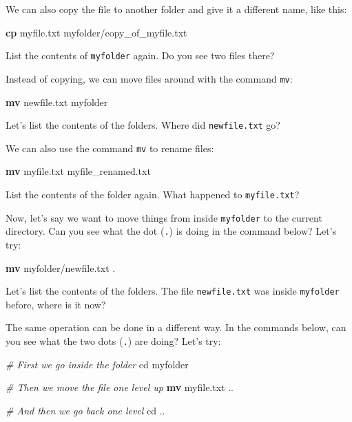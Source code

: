 \documentclass[
]{book}
\newenvironment{Shaded}{\begin{snugshade}}{\end{snugshade}}
\newcommand{\BuiltInTok}[1]{#1}
\newcommand{\CommentTok}[1]{\textcolor[rgb]{0.56,0.35,0.01}{\textit{#1}}}
\newcommand{\FunctionTok}[1]{\textcolor[rgb]{0.13,0.29,0.53}{\textbf{#1}}}
\newcommand{\NormalTok}[1]{#1}
\begin{document}
We can also copy the file to another folder and give it a different name, like this:

\begin{Shaded}
\begin{Highlighting}[]
\FunctionTok{cp}\NormalTok{ myfile.txt myfolder/copy\_of\_myfile.txt}
\end{Highlighting}
\end{Shaded}

List the contents of \texttt{myfolder} again. Do you see two files there?

Instead of copying, we can move files around with the command \texttt{mv}:

\begin{Shaded}
\begin{Highlighting}[]
\FunctionTok{mv}\NormalTok{ newfile.txt myfolder}
\end{Highlighting}
\end{Shaded}

Let's list the contents of the folders. Where did \texttt{newfile.txt} go?

We can also use the command \texttt{mv} to rename files:

\begin{Shaded}
\begin{Highlighting}[]
\FunctionTok{mv}\NormalTok{ myfile.txt myfile\_renamed.txt}
\end{Highlighting}
\end{Shaded}

List the contents of the folder again. What happened to \texttt{myfile.txt}?

Now, let's say we want to move things from inside \texttt{myfolder} to the current directory. Can you see what the dot (\texttt{.}) is doing in the command below? Let's try:

\begin{Shaded}
\begin{Highlighting}[]
\FunctionTok{mv}\NormalTok{ myfolder/newfile.txt .}
\end{Highlighting}
\end{Shaded}

Let's list the contents of the folders. The file \texttt{newfile.txt} was inside \texttt{myfolder} before, where is it now?

The same operation can be done in a different way. In the commands below, can you see what the two dots (\texttt{.}) are doing? Let's try:

\begin{Shaded}
\begin{Highlighting}[]
\CommentTok{\# First we go inside the folder}
\BuiltInTok{cd}\NormalTok{ myfolder}

\CommentTok{\# Then we move the file one level up}
\FunctionTok{mv}\NormalTok{ myfile.txt ..}

\CommentTok{\# And then we go back one level}
\BuiltInTok{cd}\NormalTok{ ..}
\end{Highlighting}
\end{Shaded}
\end{document}
